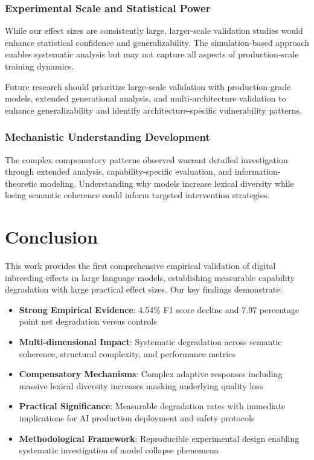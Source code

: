 \documentclass[11pt]{article}
\begin{document}
\subsubsection{Experimental Scale and Statistical Power}

While our effect sizes are consistently large, larger-scale validation studies would enhance statistical confidence and generalizability. The simulation-based approach enables systematic analysis but may not capture all aspects of production-scale training dynamics.

Future research should prioritize large-scale validation with production-grade models, extended generational analysis, and multi-architecture validation to enhance generalizability and identify architecture-specific vulnerability patterns.

\subsubsection{Mechanistic Understanding Development}

The complex compensatory patterns observed warrant detailed investigation through extended analysis, capability-specific evaluation, and information-theoretic modeling. Understanding why models increase lexical diversity while losing semantic coherence could inform targeted intervention strategies.

\section{Conclusion}

This work provides the first comprehensive empirical validation of digital inbreeding effects in large language models, establishing measurable capability degradation with large practical effect sizes. Our key findings demonstrate:

\begin{itemize}
    \item \textbf{Strong Empirical Evidence}: 4.54\% F1 score decline and 7.97 percentage point net degradation versus controls
    \item \textbf{Multi-dimensional Impact}: Systematic degradation across semantic coherence, structural complexity, and performance metrics
    \item \textbf{Compensatory Mechanisms}: Complex adaptive responses including massive lexical diversity increases masking underlying quality loss
    \item \textbf{Practical Significance}: Measurable degradation rates with immediate implications for AI production deployment and safety protocols
    \item \textbf{Methodological Framework}: Reproducible experimental design enabling systematic investigation of model collapse phenomena
\end{itemize}
\end{document}

